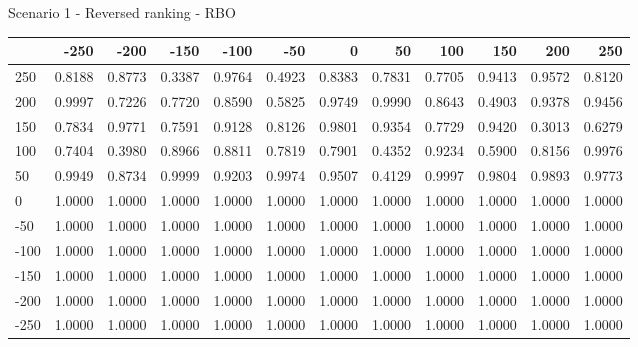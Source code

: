 Scenario 1 - Reversed ranking - RBO
\begin{tabular}{lrrrrrrrrrrr}
\toprule
{} &   -250 &   -200 &   -150 &   -100 &   -50  &    0   &    50  &    100 &    150 &    200 &    250 \\
\midrule
 250 & 0.8188 & 0.8773 & 0.3387 & 0.9764 & 0.4923 & 0.8383 & 0.7831 & 0.7705 & 0.9413 & 0.9572 & 0.8120 \\
 200 & 0.9997 & 0.7226 & 0.7720 & 0.8590 & 0.5825 & 0.9749 & 0.9990 & 0.8643 & 0.4903 & 0.9378 & 0.9456 \\
 150 & 0.7834 & 0.9771 & 0.7591 & 0.9128 & 0.8126 & 0.9801 & 0.9354 & 0.7729 & 0.9420 & 0.3013 & 0.6279 \\
 100 & 0.7404 & 0.3980 & 0.8966 & 0.8811 & 0.7819 & 0.7901 & 0.4352 & 0.9234 & 0.5900 & 0.8156 & 0.9976 \\
 50  & 0.9949 & 0.8734 & 0.9999 & 0.9203 & 0.9974 & 0.9507 & 0.4129 & 0.9997 & 0.9804 & 0.9893 & 0.9773 \\
 0   & 1.0000 & 1.0000 & 1.0000 & 1.0000 & 1.0000 & 1.0000 & 1.0000 & 1.0000 & 1.0000 & 1.0000 & 1.0000 \\
-50  & 1.0000 & 1.0000 & 1.0000 & 1.0000 & 1.0000 & 1.0000 & 1.0000 & 1.0000 & 1.0000 & 1.0000 & 1.0000 \\
-100 & 1.0000 & 1.0000 & 1.0000 & 1.0000 & 1.0000 & 1.0000 & 1.0000 & 1.0000 & 1.0000 & 1.0000 & 1.0000 \\
-150 & 1.0000 & 1.0000 & 1.0000 & 1.0000 & 1.0000 & 1.0000 & 1.0000 & 1.0000 & 1.0000 & 1.0000 & 1.0000 \\
-200 & 1.0000 & 1.0000 & 1.0000 & 1.0000 & 1.0000 & 1.0000 & 1.0000 & 1.0000 & 1.0000 & 1.0000 & 1.0000 \\
-250 & 1.0000 & 1.0000 & 1.0000 & 1.0000 & 1.0000 & 1.0000 & 1.0000 & 1.0000 & 1.0000 & 1.0000 & 1.0000 \\
\bottomrule
\end{tabular}

